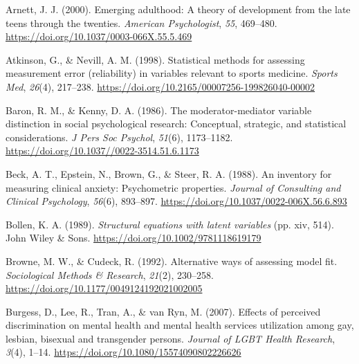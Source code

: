 \documentclass[
  man]{apa7}
\newlength{\cslhangindent}
\newlength{\cslentryspacingunit} %
\newenvironment{CSLReferences}[2] %
 {%
  \setlength{\parindent}{0pt}
  \ifodd #1
  \let\oldpar\par
  \def\par{\hangindent=\cslhangindent\oldpar}
  \fi
  \setlength{\parskip}{#2\cslentryspacingunit}
 }%
 {}
\begin{document}
\hypertarget{refs}{}
\begin{CSLReferences}{1}{0}
\leavevmode{}%
Arnett, J. J. (2000). Emerging adulthood: {A} theory of development from the late teens through the twenties. \emph{American Psychologist}, \emph{55}, 469--480. \url{https://doi.org/10.1037/0003-066X.55.5.469}

\leavevmode{}%
Atkinson, G., \& Nevill, A. M. (1998). Statistical methods for assessing measurement error (reliability) in variables relevant to sports medicine. \emph{Sports Med}, \emph{26}(4), 217--238. \url{https://doi.org/10.2165/00007256-199826040-00002}

\leavevmode{}%
Baron, R. M., \& Kenny, D. A. (1986). The moderator-mediator variable distinction in social psychological research: Conceptual, strategic, and statistical considerations. \emph{J Pers Soc Psychol}, \emph{51}(6), 1173--1182. \url{https://doi.org/10.1037//0022-3514.51.6.1173}

\leavevmode{}%
Beck, A. T., Epstein, N., Brown, G., \& Steer, R. A. (1988). An inventory for measuring clinical anxiety: {Psychometric} properties. \emph{Journal of Consulting and Clinical Psychology}, \emph{56}(6), 893--897. \url{https://doi.org/10.1037/0022-006X.56.6.893}

\leavevmode{}%
Bollen, K. A. (1989). \emph{Structural equations with latent variables} (pp. xiv, 514). John Wiley \& Sons. \url{https://doi.org/10.1002/9781118619179}

\leavevmode{}%
Browne, M. W., \& Cudeck, R. (1992). Alternative ways of assessing model fit. \emph{Sociological Methods \& Research}, \emph{21}(2), 230--258. \url{https://doi.org/10.1177/0049124192021002005}

\leavevmode{}%
Burgess, D., Lee, R., Tran, A., \& van Ryn, M. (2007). Effects of perceived discrimination on mental health and mental health services utilization among gay, lesbian, bisexual and transgender persons. \emph{Journal of LGBT Health Research}, \emph{3}(4), 1--14. \url{https://doi.org/10.1080/15574090802226626}


\end{CSLReferences}
\end{document}
